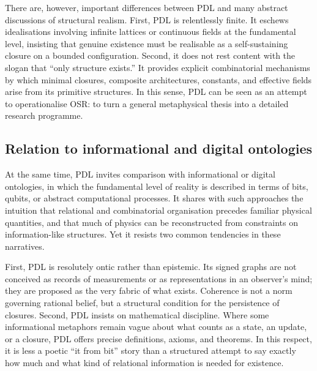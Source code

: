 \documentclass[11pt,a4paper]{article}
\theoremstyle{definition}
\begin{document}
There are, however, important differences between PDL and many abstract discussions of structural realism. First, PDL is relentlessly finite. It eschews idealisations involving infinite lattices or continuous fields at the fundamental level, insisting that genuine existence must be realisable as a self-sustaining closure on a bounded configuration.\cite{Laubscher_EmergencePhysicalReality_2024,Laubscher_MinimalClosures_46_2024} Second, it does not rest content with the slogan that ``only structure exists.'' It provides explicit combinatorial mechanisms by which minimal closures, composite architectures, constants, and effective fields arise from its primitive structures.\cite{Laubscher_PDL_GlobalMapping_v6_2024} In this sense, PDL can be seen as an attempt to operationalise OSR: to turn a general metaphysical thesis into a detailed research programme.

\subsection{Relation to informational and digital ontologies}

At the same time, PDL invites comparison with informational or digital ontologies, in which the fundamental level of reality is described in terms of bits, qubits, or abstract computational processes. It shares with such approaches the intuition that relational and combinatorial organisation precedes familiar physical quantities, and that much of physics can be reconstructed from constraints on information-like structures.\cite{Laubscher_EmergencePhysicalReality_2024,Laubscher_EffectiveFields_2024} Yet it resists two common tendencies in these narratives.

First, PDL is resolutely ontic rather than epistemic. Its signed graphs are not conceived as records of measurements or as representations in an observer’s mind; they are proposed as the very fabric of what exists.\cite{Laubscher_PDL_Position_2024,Laubscher_Leakage_Probability_2024} Coherence is not a norm governing rational belief, but a structural condition for the persistence of closures. Second, PDL insists on mathematical discipline. Where some informational metaphors remain vague about what counts as a state, an update, or a closure, PDL offers precise definitions, axioms, and theorems.\cite{Laubscher_IntroPDL_2024,Laubscher_MinimalClosures_46_2024} In this respect, it is less a poetic ``it from bit'' story than a structured attempt to say exactly how much and what kind of relational information is needed for existence.
\end{document}
